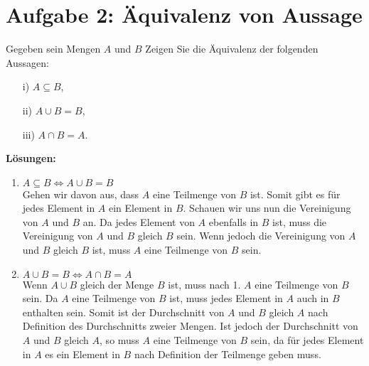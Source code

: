 \documentclass{exam}
\begin{document}
\section*{Aufgabe 2: Äquivalenz von Aussage}
Gegeben sein Mengen $A$ und $B$ Zeigen Sie die Äquivalenz der folgenden Aussagen:
\begin{enumerate}
    \item[i)] $ A \subseteq B $,
    \item[ii)] $ A \cup B = B $,
    \item[iii)] $ A \cap B = A $.
\end{enumerate}
\textbf{Lösungen:}
\begin{enumerate}
    \item $ A \subseteq B \Leftrightarrow A \cup B = B $ \\
          Gehen wir davon aus, dass $A$ eine Teilmenge von $B$ ist.
          Somit gibt es für jedes Element in $A$ ein Element in $B$.
          Schauen wir uns nun die Vereinigung von $A$ und $B$ an.
          Da jedes Element von $A$ ebenfalls in $B$ ist, muss die Vereinigung von $A$ und $B$ gleich $B$ sein.
          Wenn jedoch die Vereinigung von $A$ und $B$ gleich $B$ ist, muss $A$ eine Teilmenge von $B$ sein.
    \item $ A \cup B = B \Leftrightarrow A \cap B = A $ \\
          Wenn $ A \cup B $ gleich der Menge $B$ ist, muss nach 1. $A$ eine Teilmenge von $B$ sein.
          Da $A$ eine Teilmenge von $B$ ist, muss jedes Element in $A$ auch in $B$ enthalten sein.
          Somit ist der Durchschnitt von $A$ und $B$ gleich $A$ nach Definition des Durchschnitts zweier Mengen.
          Ist jedoch der Durchschnitt von $A$ und $B$ gleich $A$, so muss $A$ eine Teilmenge von $B$ sein,
          da für jedes Element in $A$ es ein Element in $B$ nach Definition der Teilmenge geben muss.
\end{enumerate}
\end{document}
